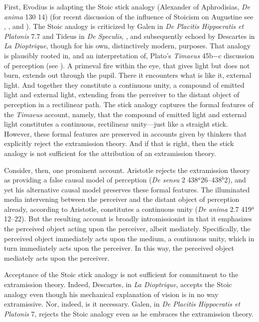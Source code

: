 \documentclass[12pt]{article}
\begin{document}
First, Evodius is adapting the Stoic stick analogy (Alexander of Aphrodisias, \emph{De anima} 130 14) (for recent discussion of the influence of Stoicism on Augustine see \citealt{Brittain:2002hl}, \citealt{Byers:2013jh}, and \citealt{Sellars:2013aa}). The Stoic analogy is criticized by Galen in \emph{De Placitis Hippocratis et Platonis} 7.7 and Tideus in \emph{De Speculis}, \citet{Bjombo:1912aa}, and subsequently echoed by Descartes in \emph{La Dioptrique}, though for his own, distinctively modern, purposes. That analogy is plausibly rooted in, and an interpretation of, Plato's \emph{Timaeus} 45b−c discussion of perception (see \citealt[chapter one]{Lindberg:1977aa}). A primeval fire within the eye, that gives light but does not burn, extends out through the pupil. There it encounters what is like it, external light. And together they constitute a continuous unity, a compound of emitted light and external light, extending from the perceiver to the distant object of perception in a rectilinear path. The stick analogy captures the formal features of the \emph{Timaeus} account, namely, that the compound of emitted light and external light constitutes a continuous, rectilinear unity---just like a straight stick. However, these formal features are preserved in accounts given by thinkers that explicitly reject the extramission theory. And if that is right, then the stick analogy is not sufficient for the attribution of an extramission theory. 

Consider, then, one prominent account. Aristotle rejects the extramission theory as providing a false causal model of perception (\emph{De sensu} 2 438\( ^{a} \)26--438\( ^{b} \)2), and yet his alternative causal model preserves these formal features. The illuminated media intervening between the perceiver and the distant object of perception already, according to Aristotle, constitutes a continuous unity (\emph{De anima} 2.7 419\( ^{a} \)12--22). But the resulting account is broadly intromissionist in that it emphasizes the perceived object acting upon the perceiver, albeit mediately. Specifically, the perceived object immediately acts upon the medium, a continuous unity, which in turn immediately acts upon the perceiver. In this way, the perceived object mediately acts upon the perceiver. 

Acceptance of the Stoic stick analogy is not sufficient for commitment to the extramission theory. Indeed, Descartes, in \emph{La Dioptrique}, accepts the Stoic analogy even though his mechanical explanation of vision is in no way extramissive. Nor, indeed, is it necessary.  Galen, in \emph{De Placitis Hippocratis et Platonis} 7, rejects the Stoic analogy even as he embraces the extramission theory.
\end{document}

